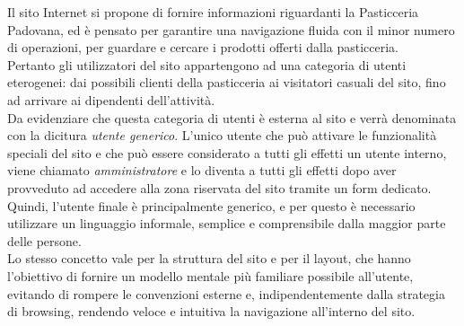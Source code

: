 Il sito Internet si propone di fornire informazioni riguardanti la Pasticceria Padovana, ed è pensato per garantire una navigazione fluida con il minor numero di operazioni, 
per guardare e cercare i prodotti offerti dalla pasticceria.\\
Pertanto gli utilizzatori del sito appartengono ad una categoria di utenti eterogenei: dai possibili clienti della pasticceria ai visitatori casuali del sito, 
fino ad arrivare ai dipendenti dell'attività.\\
Da evidenziare che questa categoria di utenti è esterna al sito e verrà denominata con la dicitura \emph{utente generico}.
L'unico utente che può attivare le funzionalità speciali del sito e che può essere considerato a tutti gli effetti un utente interno, viene chiamato \emph{amministratore} e 
lo diventa a tutti gli effetti dopo aver provveduto ad accedere alla zona riservata del sito tramite un form dedicato.\\
Quindi, l'utente finale è principalmente generico, e per questo è necessario utilizzare un linguaggio informale, semplice e comprensibile dalla maggior parte delle persone.\\ 
Lo stesso concetto vale per la struttura del sito e per il layout, che hanno l'obiettivo di fornire un modello mentale più familiare possibile all'utente, 
evitando di rompere le convenzioni esterne e, indipendentemente dalla strategia di browsing, rendendo veloce e intuitiva la navigazione all'interno del sito.\\